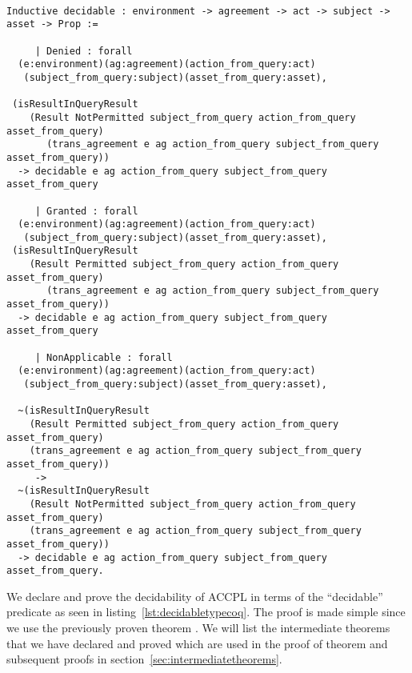 \begin{lstlisting}

Inductive decidable : environment -> agreement -> act -> subject -> asset -> Prop :=

     | Denied : forall
  (e:environment)(ag:agreement)(action_from_query:act)
   (subject_from_query:subject)(asset_from_query:asset), 

 (isResultInQueryResult 
    (Result NotPermitted subject_from_query action_from_query asset_from_query)
       (trans_agreement e ag action_from_query subject_from_query asset_from_query)) 
  -> decidable e ag action_from_query subject_from_query asset_from_query

     | Granted : forall
  (e:environment)(ag:agreement)(action_from_query:act)
   (subject_from_query:subject)(asset_from_query:asset), 
 (isResultInQueryResult 
    (Result Permitted subject_from_query action_from_query asset_from_query)
       (trans_agreement e ag action_from_query subject_from_query asset_from_query)) 
  -> decidable e ag action_from_query subject_from_query asset_from_query

     | NonApplicable : forall
  (e:environment)(ag:agreement)(action_from_query:act)
   (subject_from_query:subject)(asset_from_query:asset), 

  ~(isResultInQueryResult 
    (Result Permitted subject_from_query action_from_query asset_from_query)
    (trans_agreement e ag action_from_query subject_from_query asset_from_query)) 
     ->
  ~(isResultInQueryResult 
    (Result NotPermitted subject_from_query action_from_query asset_from_query)
    (trans_agreement e ag action_from_query subject_from_query asset_from_query)) 
  -> decidable e ag action_from_query subject_from_query asset_from_query.
\end{lstlisting}


We declare and prove the decidability of \ac{ACCPL} in terms of the ``decidable'' predicate as seen in listing~\ref{lst:decidabletypecoq}. The proof is made simple since we use the previously proven theorem . We will list the intermediate theorems that we have declared and proved which are used in the proof of theorem  and subsequent proofs in section~\ref{sec:intermediatetheorems}.

